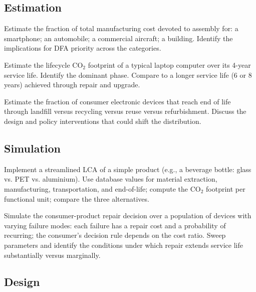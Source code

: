\subsection*{Estimation}

\begin{exercise}
Estimate the fraction of total manufacturing cost devoted to assembly for: a smartphone; an automobile; a commercial aircraft; a building. Identify the implications for DFA priority across the categories.
\end{exercise}

\begin{exercise}
Estimate the lifecycle CO$_2$ footprint of a typical laptop computer over its 4-year service life. Identify the dominant phase. Compare to a longer service life (6 or 8 years) achieved through repair and upgrade.
\end{exercise}

\begin{exercise}
Estimate the fraction of consumer electronic devices that reach end of life through landfill versus recycling versus reuse versus refurbishment. Discuss the design and policy interventions that could shift the distribution.
\end{exercise}

\subsection*{Simulation}

\begin{exercise}
Implement a streamlined LCA of a simple product (e.g., a beverage bottle: glass vs. PET vs. aluminium). Use database values for material extraction, manufacturing, transportation, and end-of-life; compute the CO$_2$ footprint per functional unit; compare the three alternatives.
\end{exercise}

\begin{exercise}
Simulate the consumer-product repair decision over a population of devices with varying failure modes: each failure has a repair cost and a probability of recurring; the consumer's decision rule depends on the cost ratio. Sweep parameters and identify the conditions under which repair extends service life substantially versus marginally.
\end{exercise}

\subsection*{Design}

